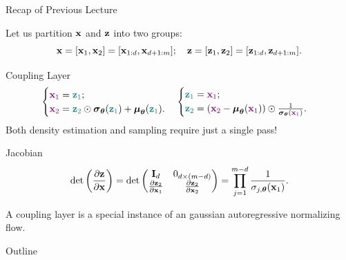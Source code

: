 \documentclass{beamer}
\begin{document}
\begin{frame}{Recap of Previous Lecture}

	Let us partition $\mathbf{x}$ and $\mathbf{z}$ into two groups: 
	\[
		\mathbf{x} = [\mathbf{x}_1, \mathbf{x}_2] = [\mathbf{x}_{1:d}, \mathbf{x}_{d+1:m}]; \quad \mathbf{z} = [\mathbf{z}_1, \mathbf{z}_2] = [\mathbf{z}_{1:d}, \mathbf{z}_{d+1:m}].
	\]
	\vspace{-0.7cm}
	\begin{block}{Coupling Layer}
		\vspace{-0.7cm}
		\[
			\begin{cases} {\color{violet}\mathbf{x}_1} = {\color{teal}\mathbf{z}_1}; \\ {\color{violet}\mathbf{x}_2} = {\color{teal}\mathbf{z}_2} \odot \boldsymbol{\sigma}_{\boldsymbol{\theta}}({\color{teal}\mathbf{z}_1}) + \boldsymbol{\mu}_{\boldsymbol{\theta}}({\color{teal}\mathbf{z}_1}).\end{cases}  
			\begin{cases} {\color{teal}\mathbf{z}_1} ={\color{violet} \mathbf{x}_1}; \\ {\color{teal}\mathbf{z}_2} = \left({\color{violet}\mathbf{x}_2} - \boldsymbol{\mu}_{\boldsymbol{\theta}}({\color{violet}\mathbf{x}_1}) \right) \odot \frac{1}{\boldsymbol{\sigma}_{\boldsymbol{\theta}}({\color{violet}\mathbf{x}_1})}.\end{cases}
		\]
		Both density estimation and sampling require just a single pass!
	\end{block}
	\begin{block}{Jacobian}
		\vspace{-0.3cm}
		\[
			\det \left( \frac{\partial \mathbf{z}}{\partial \mathbf{x}} \right) = \det 
			\begin{pmatrix}
				\mathbf{I}_d & 0_{d \times (m - d)} \\
				\frac{\partial \mathbf{z}_2}{\partial \mathbf{x}_1} & \frac{\partial \mathbf{z}_2}{\partial \mathbf{x}_2}
			\end{pmatrix} = \prod_{j=1}^{m - d} \frac{1}{\sigma_{j, \boldsymbol{\theta}}(\mathbf{x}_1)}.
		\]
	\end{block}
	A coupling layer is a special instance of an gaussian autoregressive normalizing flow.
\end{frame}
\begin{frame}{Outline}
    \tableofcontents
\end{frame}
\end{document}
